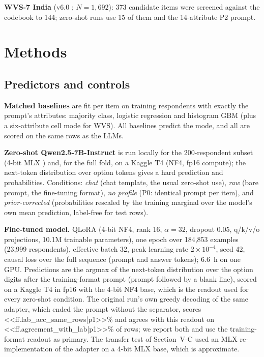 \documentclass[conference]{IEEEtran}
\begin{document}
\textbf{WVS-7 India} (v6.0 \cite{wvs7}; $N=1{,}692$): 373 candidate items were screened against the codebook to 144; zero-shot runs use 15 of them and the 14-attribute P2 prompt.

\section{Methods}

\subsection{Predictors and controls}

\textbf{Matched baselines} are fit per item on training respondents with exactly the prompt's attributes: majority class, logistic regression and histogram GBM \cite{pedregosa2011} (plus a six-attribute cell mode for WVS). All baselines predict the mode, and all are scored on the same rows as the LLMs.

\textbf{Zero-shot Qwen2.5-7B-Instruct} \cite{qwen2025} is run locally for the 200-respondent subset (4-bit MLX \cite{mlx2023}) and, for the full fold, on a Kaggle T4 (NF4, fp16 compute); the next-token distribution over option tokens gives a hard prediction and probabilities. Conditions: \emph{chat} (chat template, the usual zero-shot use), \emph{raw} (bare prompt, the fine-tuning format), \emph{no profile} (P0: identical prompt per item), and \emph{prior-corrected} (probabilities rescaled by the training marginal over the model's own mean prediction, label-free for test rows).

\textbf{Fine-tuned model.} QLoRA \cite{dettmers2023,hu2022} (4-bit NF4, rank 16, $\alpha{=}32$, dropout 0.05, q/k/v/o projections, 10.1M trainable parameters), one epoch over 184{,}853 examples (23{,}999 respondents), effective batch 32, peak learning rate $2\times10^{-4}$, seed 42, causal loss over the full sequence (prompt and answer tokens); 6.6~h on one GPU. Predictions are the argmax of the next-token distribution over the option digits after the training-format prompt (prompt followed by a blank line), scored on a Kaggle T4 in fp16 with the 4-bit NF4 base, which is the readout used for every zero-shot condition. The original run's own greedy decoding of the same adapter, which ended the prompt without the separator, scores <<ff.lab_acc_same_rows|p1>>\% and agrees with this readout on <<ff.agreement_with_lab|p1>>\% of rows; we report both and use the training-format readout as primary. The transfer test of Section~V-C used an MLX re-implementation of the adapter on a 4-bit MLX base, which is approximate.
\end{document}
